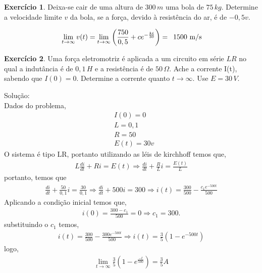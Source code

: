 \documentclass[a4paper,12pt,reqno,natbib]{amsart}
\theoremstyle{definition}
\newtheorem{exercise}{Exerc\'icio}
\begin{document}
\begin{exercise}
Deixa-se cair de uma altura de $300\,m$ uma bola de $75\,kg$. Determine a velocidade limite $v$ da bola, se a força, devido à resistência do ar, é de $-0,5v$.
\end{exercise}
\begin{align*}
	&\lim_{t\rightarrow\infty}v(t) = \lim_{t\rightarrow\infty}\left (\frac{750}{0,5} +
	c e^{-\frac{kt}{30}}\right ) =\enskip \mbox{1500 m/s} \\ 
\end{align*}


\newpage



\begin{center}
\end{center}

\vspace{0.7 cm}

\begin{exercise}
Uma força eletromotriz é aplicada a um circuito em série $LR$ no qual a indutância é de $0,1\,H$ e a resistência é de $50\,\Omega$. Ache a corrente I(t), sabendo que $I(0) = 0$. Determine a corrente quanto $t \rightarrow \infty$. Use $E = 30\, V$.
\end{exercise}
Solu\c c\~ao:\\
Dados do problema,
\begin{align*}
	&I(0) = 0\\
	& L = 0,1\\
	&R = 50\\
	& E(t) = 30v
\end{align*}
O sistema \'e tipo LR, portanto utilizando as l\'eis de kirchhoff temos que,
\begin{align*}
	L\frac{di}{dt} + Ri = E(t) \Rightarrow \frac{di}{dt} + \frac{R}{L}i = \frac{E(t)}{L}
\end{align*}
portanto, temos que
\begin{align*}
	\frac{di}{dt} + \frac{50}{0,1}i = \frac{30}{0,1} \Rightarrow \frac{di}{dt} + 500i = 300 \Rightarrow i(t) =
	\frac{300}{500} - \frac{c_1e^{-500t}}{500} 
\end{align*}
Aplicando a condi\c c\~ao inicial temos que,
\begin{align*}
	i(0) = \frac{300 - c_1}{500} = 0 \Rightarrow c_1 = 300.
\end{align*}
substituindo o $c_1$ temos,
\begin{align*}
	i(t) = \frac{300}{500} -  \frac{300e^{-500t}}{500} \Rightarrow i(t) = \frac{3}{5}\left (1 -
	e^{-500t}\right ) 
\end{align*}
logo,
\begin{align*}
	\lim_{t\rightarrow\infty} \frac{3}{5}\left (1 -e^{\frac{-t}{500}} \right) = \frac{3}{5} A
\end{align*}
\end{document}
